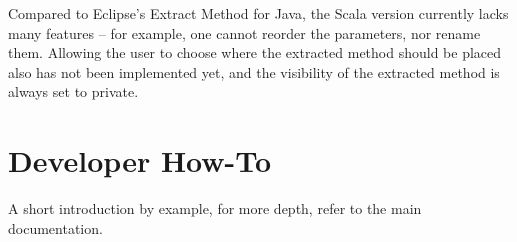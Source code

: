 \documentclass[10pt,a4paper,oneside]{scrreprt}
\begin{document}
Compared to Eclipse's Extract Method for Java, the Scala version currently lacks many features -- for example, one cannot reorder the parameters, nor rename them. Allowing the user to choose where the extracted method should be placed also has not been implemented yet, and the visibility of the extracted method is always set to private.

\chapter{Developer How-To} \label{chapter:developer-how-to}

A short introduction by example, for more depth, refer to the main documentation.





\clearpage
\bib
\end{document}
